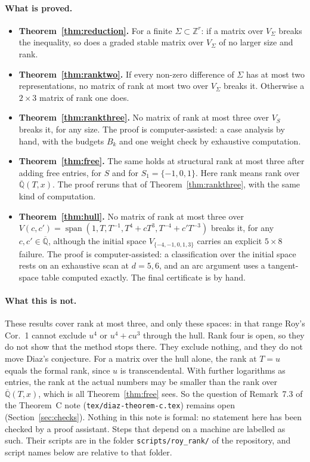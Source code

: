 \documentclass[11pt,a4paper]{article}
\theoremstyle{plain}
\theoremstyle{definition}
\newcommand{\Z}{\mathbb{Z}}
\newcommand{\Qbar}{\overline{\mathbb{Q}}}
\newcommand{\spn}{\operatorname{span}}
\newcommand{\scr}[1]{\nolinkurl{#1}}
\begin{document}
\paragraph{What is proved.}
\begin{itemize}
\item \textbf{Theorem~\ref{thm:reduction}.} For a finite $\Sigma\subset\Z^{r}$: if a matrix over $V_{\Sigma}$ breaks the
inequality, so does a graded stable matrix over $V_{\Sigma}$ of no larger size and rank.
\item \textbf{Theorem~\ref{thm:ranktwo}.} If every non-zero difference of $\Sigma$ has at most two representations, no matrix
of rank at most two over $V_{\Sigma}$ breaks it. Otherwise a $2\times3$ matrix of rank one does.
\item \textbf{Theorem~\ref{thm:rankthree}.} No matrix of rank at most three over $V_{S}$ breaks it, for any size. The proof is computer-assisted: a case analysis by hand, with the budgets $B_{k}$ and one weight check by exhaustive computation.
\item \textbf{Theorem~\ref{thm:free}.} The same holds at structural rank at most three after adding free entries, for $S$ and for
$S_{1}=\{-1,0,1\}$. Here rank means rank over $\Qbar(T,x)$. The proof reruns that of Theorem~\ref{thm:rankthree}, with the same kind of computation.
\item \textbf{Theorem~\ref{thm:hull}.} No matrix of rank at most three over $V(c,c')=\spn(1,T,T^{-1},T^{4}+cT^{3},T^{-4}+c'T^{-3})$
breaks it, for any $c,c'\in\Qbar$, although the initial space $V_{\{-4,-1,0,1,3\}}$ carries an explicit $5\times8$ failure. The proof is computer-assisted: a classification over the initial space rests on an exhaustive scan at $d=5,6$, and an arc argument uses a tangent-space table computed exactly. The final certificate is by hand.
\end{itemize}

\paragraph{What this is not.} These results cover rank at most three, and only these spaces: in that range Roy's Cor.~1 cannot exclude $u^{4}$ or $u^{4}+cu^{3}$ through the hull. Rank four is open, so they do not show that the method stops there. They exclude nothing, and
they do not move Diaz's conjecture. For a matrix over the hull alone, the rank at $T=u$ equals the formal rank, since $u$ is transcendental. With further logarithms as entries, the rank at the actual numbers may be smaller than the rank over $\Qbar(T,x)$, which is all Theorem~\ref{thm:free} sees. So the
question of Remark~7.3 of the Theorem~C note \cite{TC} (\texttt{tex/diaz-theorem-c.tex}) remains open (Section~\ref{sec:checks}). Nothing in this note is formal: no statement here has
been checked by a proof assistant. Steps that depend on a machine are labelled as such. Their scripts are in the folder
\scr{scripts/roy_rank/} of the repository, and script names below are relative to that folder.
\end{document}
